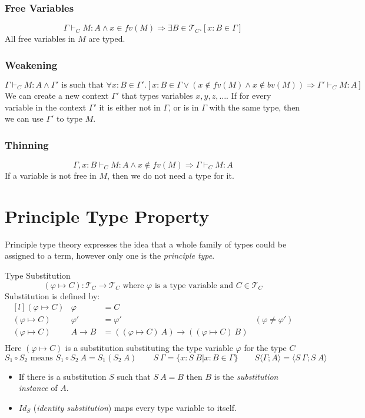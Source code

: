 \subsubsection{Free Variables}
\[\Gamma \vdash_C M : A \land x \in fv(M) \Rightarrow \exists B \in \mathcal{T}_C . [x : B \in \Gamma]\]
All free variables in $M$ are typed.
\subsubsection{Weakening}
\[\Gamma \vdash_C M : A \land \Gamma' \text{ is such that } \forall x: B \in \Gamma' . [x:B \in \Gamma \lor (x \not\in fv(M) \land x \not\in bv(M)) \Rightarrow \Gamma' \vdash_C M : A]\]
We can create a new context $\Gamma'$ that types variables $x,y,z, \dots$. If for every variable in the context $\Gamma'$ it is either not in $\Gamma$, or is in $\Gamma$  with the same type, then we can use $\Gamma'$ to type $M$.

\subsubsection{Thinning}
\[\Gamma, x:B \vdash_C M : A \land x \not\in fv(M) \Rightarrow \Gamma \vdash_C M : A\]
If a variable is not free in $M$, then we do not need a type for it.

\section{Principle Type Property}
Principle type theory expresses the idea that a whole family of types could be assigned to a term, however only one is the \textit{principle type}.
\begin{definitionbox}{Type Substitution}
    \[(\varphi \mapsto C) : \mathcal{T}_C \to \mathcal{T}_C \text{ where } \varphi \text{ is a type variable and } C \in \mathcal{T}_C\]
    Substitution is defined by:
    \[\begin{matrix*}[l]
        (\varphi \mapsto C) & \varphi & = C \\
        (\varphi \mapsto C) & \varphi' & = \varphi' & (\varphi \neq \varphi') \\
        (\varphi \mapsto C) & A \to B &= ((\varphi \mapsto C) \ A) \to ((\varphi \mapsto C) \ B) \\
    \end{matrix*}\]
    Here $(\varphi \mapsto C)$ is a substitution substituting the type variable $\varphi$ for the type $C$
    \[S_1 \circ S_2 \text{ means } S_1 \circ S_2 \ A = S_1 (S_2 \ A) \qquad S \ \Gamma = \{x: S \ B | x:B \in \Gamma\} \qquad S \langle \Gamma ; A \rangle = \langle S \ \Gamma ; S \ A \rangle\]
    \begin{itemize}
        \item If there is a substitution $S$ such that $S \ A = B$ then $B$ is the \textit{substitution instance} of $A$.
        \item $Id_S$ (\textit{identity substitution}) maps every type variable to itself.
    \end{itemize}
\end{definitionbox}

